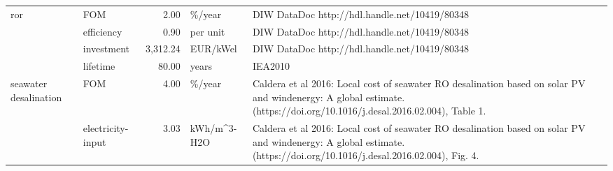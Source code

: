 \begin{longtable}{p{5cm}p{3cm}rp{3cm}p{11cm}}
ror & FOM &           2.00 &                            \%/year &                                                                                                                                                                                                                                                                                        DIW DataDoc http://hdl.handle.net/10419/80348 \\
                      & efficiency &           0.90 &                          per unit &                                                                                                                                                                                                                                                                                        DIW DataDoc http://hdl.handle.net/10419/80348 \\
                      & investment &       3,312.24 &                          EUR/kWel &                                                                                                                                                                                                                                                                                        DIW DataDoc http://hdl.handle.net/10419/80348 \\
                      & lifetime &          80.00 &                             years &                                                                                                                                                                                                                                                                                                                              IEA2010 \\
seawater desalination & FOM &           4.00 &                            \%/year &                                                                                                                                                              Caldera et al 2016: Local cost of seawater RO desalination based on solar PV and windenergy: A global estimate. (https://doi.org/10.1016/j.desal.2016.02.004), Table 1. \\
                      & electricity-input &           3.03 &                       kWh/m\textasciicircum 3-H2O &                                                                                                                                                               Caldera et al 2016: Local cost of seawater RO desalination based on solar PV and windenergy: A global estimate. (https://doi.org/10.1016/j.desal.2016.02.004), Fig. 4. \\

\end{longtable}
